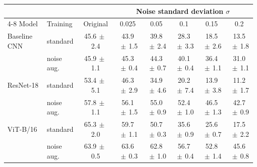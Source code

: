 \begin{tabular}{llcccccc}
\toprule
 & & & \multicolumn{5}{c}{Noise standard deviation $\sigma$} \\
\cmidrule(lr){4-8}
Model & Training & Original & 0.025 & 0.05 & 0.1 & 0.15 & 0.2 \\
\midrule
Baseline CNN & standard & 45.6{\scriptsize$\,\pm\,$2.4} & 43.9{\scriptsize$\,\pm\,$1.5} & 39.8{\scriptsize$\,\pm\,$2.4} & 28.3{\scriptsize$\,\pm\,$3.3} & 18.5{\scriptsize$\,\pm\,$2.6} & 13.5{\scriptsize$\,\pm\,$1.8} \\
 & noise aug. & 45.9{\scriptsize$\,\pm\,$1.1} & 45.3{\scriptsize$\,\pm\,$0.4} & 44.3{\scriptsize$\,\pm\,$0.7} & 40.1{\scriptsize$\,\pm\,$0.4} & 36.4{\scriptsize$\,\pm\,$1.1} & 31.0{\scriptsize$\,\pm\,$1.1} \\
\addlinespace
ResNet-18 & standard & 53.4{\scriptsize$\,\pm\,$5.1} & 46.3{\scriptsize$\,\pm\,$2.9} & 34.9{\scriptsize$\,\pm\,$4.6} & 20.2{\scriptsize$\,\pm\,$7.4} & 13.9{\scriptsize$\,\pm\,$3.8} & 11.2{\scriptsize$\,\pm\,$1.7} \\
 & noise aug. & 57.8{\scriptsize$\,\pm\,$1.1} & 56.1{\scriptsize$\,\pm\,$1.5} & 55.0{\scriptsize$\,\pm\,$0.9} & 52.4{\scriptsize$\,\pm\,$1.0} & 46.5{\scriptsize$\,\pm\,$1.3} & 42.7{\scriptsize$\,\pm\,$0.9} \\
\addlinespace
ViT-B/16 & standard & 65.3{\scriptsize$\,\pm\,$2.0} & 59.7{\scriptsize$\,\pm\,$1.1} & 50.7{\scriptsize$\,\pm\,$0.3} & 35.6{\scriptsize$\,\pm\,$0.9} & 25.6{\scriptsize$\,\pm\,$0.7} & 17.5{\scriptsize$\,\pm\,$2.2} \\
 & noise aug. & 63.9{\scriptsize$\,\pm\,$0.5} & 63.6{\scriptsize$\,\pm\,$0.3} & 62.8{\scriptsize$\,\pm\,$1.0} & 56.7{\scriptsize$\,\pm\,$0.4} & 52.8{\scriptsize$\,\pm\,$1.4} & 45.6{\scriptsize$\,\pm\,$0.8} \\
\bottomrule
\end{tabular}
